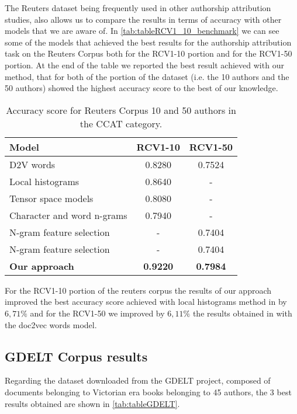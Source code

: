 The Reuters dataset being frequently used in other authorship attribution studies, also allows us to compare the results in terms of accuracy with other models that we are aware of.
In \autoref{tab:tableRCV1_10_benchmark} we can see some of the models that achieved the best results for the authorship attribution task on the Reuters Corpus both for the RCV1-10 portion and for the RCV1-50 portion.
At the end of the table we reported the best result achieved with our method, that for both of the portion of the dataset (i.e. the 10 authors and the 50 authors) showed the highest accuracy score to the best of our knowledge.
\begin{table}[h!]
	\begin{center}  
		\caption[Reuters Corpus Benchmark - 10 and 50 authors]{Accuracy score for Reuters Corpus 10 and 50 authors in the CCAT category.} 
		\label{tab:tableRCV1_10_benchmark}
		\begin{tabular}{| p{5 cm} | c | c |}
			\hline 
			Model & RCV1-10 & RCV1-50 \\
			\hline
			D2V words & 0.8280 & 0.7524 \\ \hline
			Local histograms & 0.8640 & - \\ \hline
			Tensor space models & 0.8080 & - \\ \hline
			Character and word n-grams & 0.7940 & - \\ \hline
			N-gram feature selection & - & 0.7404 \\ \hline
			N-gram feature selection & - & 0.7404 \\ \hline
			\textbf{Our approach} & \textbf{0.9220} & \textbf{0.7984} \\ \hline
		\end{tabular} 
	\end{center}
\end{table}

For the RCV1-10 portion of the reuters corpus the results of our approach improved the best accuracy score achieved with local histograms method in \cite{sari2017continuous} by $6,71\%$ and for the RCV1-50 we improved by $6,11\%$ the results obtained in \cite{posadas2017application} with the doc2vec words model.


\subsection{GDELT Corpus results}
Regarding the dataset downloaded from the GDELT project, composed of documents belonging to Victorian era books belonging to 45 authors, the 3 best results obtained are shown in \autoref{tab:tableGDELT}. 


